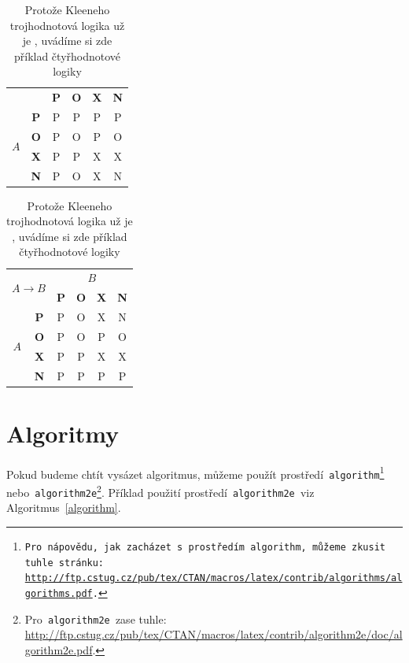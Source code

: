 \documentclass[a4paper, 11pt]{article}
\begin{document}
\begin{table}[h]
\begin{tabular}{|c|c|c|c|c|c|}
                \cline{3-6}
                \multicolumn{2}{|c|}{} 
                & \textbf{P} & \textbf{O} & \textbf{X} & \textbf{N} \\
                \cline{1-6}
                \multirow{4}{*}{$A$} 
                & \textbf{P} & P & P & P & P \\
                \cline{2-6}
                & \textbf{O} & P & O & P & O \\
                \cline{2-6}
                & \textbf{X} & P & P & X & X \\
                \cline{2-6}
                & \textbf{N} & P & O & X & N \\
            \hline
        \end{tabular}
        \begin{tabular}{|c|c|c|c|c|c|}
            \hline
                \multicolumn{2}{|c|}{\multirow{2}{*}{$A \rightarrow B$}} & \multicolumn{4}{c|}{$B$} \\
                \cline{3-6}
                \multicolumn{2}{|c|}{} 
                & \textbf{P} & \textbf{O} & \textbf{X} & \textbf{N} \\
                \cline{1-6}
                \multirow{4}{*}{$A$} 
                & \textbf{P} & P & O & X & N \\
                \cline{2-6}
                & \textbf{O} & P & O & P & O \\
                \cline{2-6}
                & \textbf{X} & P & P & X & X \\
                \cline{2-6}
                & \textbf{N} & P & P & P & P \\
            \hline
        \end{tabular} 
            
            \caption{Protože Kleeneho trojhodnotová logika už je , uvádíme si zde příklad čtyřhodnotové logiky} \label{tabulka_logiky}
\end{table}

\bigskip
\pagebreak

\section{Algoritmy}\label{algoritmy}
    Pokud budeme chtít vysázet algoritmus, můžeme použít prostředí\texttt{ algorithm\footnote{Pro nápovědu, jak zacházet s~prostředím\texttt{ algorithm,} můžeme zkusit tuhle stránku:\\
    \href{http://ftp.cstug.cz/pub/tex/CTAN/macros/latex/contrib/algorithms/algorithms.pdf}{http://ftp.cstug.cz/pub/tex/CTAN/macros/latex/contrib/algorithms/algorithms.pdf}.} } nebo\texttt{ algorithm2e}\footnote{Pro\texttt{ algorithm2e }zase tuhle:
    \href{http://ftp.cstug.cz/pub/tex/CTAN/macros/latex/contrib/algorithm2e/doc/algorithm2e.pdf}{http://ftp.cstug.cz/pub/tex/CTAN/macros/latex/contrib/algorithm2e/doc/algorithm2e.pdf}.}.
Příklad použití prostředí\verb| algorithm2e |viz Algoritmus~\ref*{algorithm}.
\end{document}
